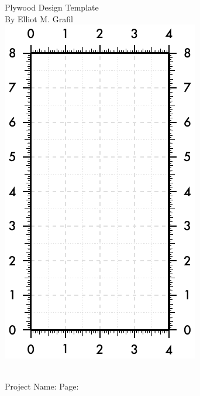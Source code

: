 \documentclass{article}
\begin{document}
\centering
{\Huge Plywood Design Template}\\
{\Large By Elliot M. Grafil} \\

\includegraphics[scale=2.5]{plywood.pdf}


~\\

{\Large Project Name:\underline{\hspace{6cm}} \hfill Page: \underline{\hspace{1.5cm}} }
\end{document}
